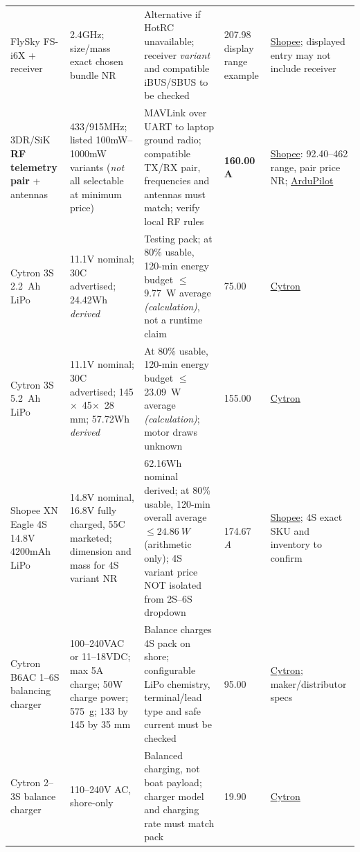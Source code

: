 \begin{longtable}{L{29mm}L{29mm}L{48mm}L{18mm}L{36mm}}
FlySky FS-i6X + receiver \cite{flyShop} & 2.4GHz; size/mass exact chosen bundle NR & Alternative if HotRC unavailable; receiver \emph{variant} and compatible iBUS/SBUS to be checked & 207.98 display range example & \href{https://shopee.com.my/FLYSKY-FS-i6X-I6X-AFHDS-2A-RC-Transmitter-with-X6B-IA6B-IA10B-Receiver-10CH-2.4GHz-for-Aairplane-Helicopter-FPV-Racing-Drones-Quadcopter-Multirotor-Free-shipping-i.155465789.25544808687}{Shopee}; displayed entry may not include receiver\\
3DR/SiK \textbf{RF telemetry pair} + antennas \cite{radioShop,radioDoc} & 433/915MHz; listed 100mW--1000mW variants (\emph{not} all selectable at minimum price) & MAVLink over UART to laptop ground radio; compatible TX/RX pair, frequencies and antennas must match; verify local RF rules & \textbf{160.00 A} & \href{https://shopee.com.my/3DR-Radio-Telemetry-433Mhz-915Mhz-100MW-500MW-1000MW-Air-and-Ground-Data-Transmit-Module-with-OTG-for-APM-2.8-Pixhawk-2.4.8-i.756673533.22527872228}{Shopee}: 92.40--462 range, pair price NR; \href{https://docs.ardupilot.org/copter/docs/common-sik-telemetry-radio.html}{ArduPilot}\\
Cytron 3S \SI{2.2}{Ah} LiPo \cite{bat22} & 11.1V nominal; 30C advertised; 24.42Wh \emph{derived} & Testing pack; at 80\% usable, 120-min energy budget $\leq$\SI{9.77}{W} average \emph{(calculation)}, not a runtime claim & 75.00 & \href{https://my.cytron.io/p-lipo-rechargeable-battery-3s-11.1v-30c-2200mah}{Cytron}\\
Cytron 3S \SI{5.2}{Ah} LiPo \cite{bat52} & 11.1V nominal; 30C advertised; \mbox{145$\times$ 45$\times$ 28\,mm}; 57.72Wh \emph{derived} & At 80\% usable, 120-min energy budget $\leq$\SI{23.09}{W} average \emph{(calculation)}; motor draws unknown & 155.00 & \href{https://my.cytron.io/p-lipo-rechargeable-battery-11.1v-5200mah}{Cytron}\\
Shopee XN Eagle 4S 14.8V 4200mAh LiPo \cite{bat4Shopee} & 14.8V nominal, 16.8V fully charged, 55C marketed; dimension and mass for 4S variant NR & 62.16Wh nominal derived; at 80\% usable, 120-min overall average $\leq\SI{24.86}{W}$ (arithmetic only); 4S variant price NOT isolated from 2S--6S dropdown & 174.67 \emph{A} & \href{https://shopee.com.my/XN-Eagle-lithium-lipo-battery-4200mah-55c-2s-3s-4s-6s-7.4v-11.1v-14.8v-22.2v-i.10855326.3111591551}{Shopee}; 4S exact SKU and inventory to confirm\\
Cytron B6AC 1--6S balancing charger \cite{charger4} & 100--240VAC or 11--18VDC; max 5A charge; 50W charge power; \SI{575}{g}; 133 by 145 by 35 mm & Balance charges 4S pack on shore; configurable LiPo chemistry, terminal/lead type and safe current must be checked & 95.00 & \href{https://my.cytron.io/p-multi-function-lipo-balance-charger-13853}{Cytron}; maker/distributor specs\\
Cytron 2--3S balance charger \cite{charger} & 110--240V AC, shore-only & Balanced charging, not boat payload; charger model and charging rate must match pack & 19.90 & \href{https://my.cytron.io/p-2-3-cell-lipo-balance-charger}{Cytron}\\
\end{longtable}
